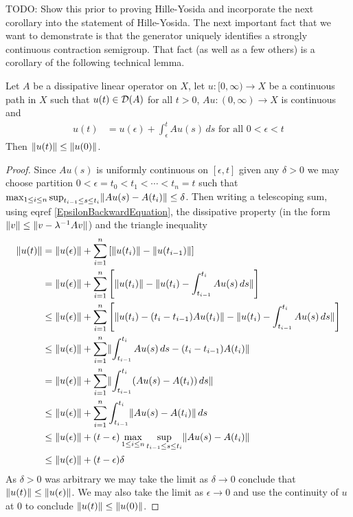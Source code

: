 TODO:  Show this prior to proving Hille-Yosida and incorporate the next corollary into the statement of Hille-Yosida.  
The next important fact that we want to demonstrate is that the generator uniquely identifies a strongly continuous contraction semigroup.  That fact (as well as a few others) is a corollary of the following technical lemma.
\begin{lem}\label{DissipativeContractivePath}Let $A$ be a dissipative linear operator on $X$, let $u : [0,\infty) \to X$ be a continuous path in $X$ such that $u(t) \in \mathcal{D}(A)$ for all $t > 0$, $A u : (0,\infty) \to X$ is continuous and 
\begin{align}\label{EpsilonBackwardEquation}
u(t) &= u(\epsilon) + \int_\epsilon^t A u(s) \, ds \text{ for all $0 < \epsilon < t$}
\end{align}
Then $\lVert u(t) \rVert \leq \lVert u(0) \rVert$.
\end{lem}
\begin{proof}
Since $Au(s)$ is uniformly continuous on $[\epsilon, t]$ given any $\delta > 0$ we may choose partition $0< \epsilon=t_0 < t_1 < \dotsb < t_n =t$ such that $\max_{1 \leq i \leq n} \sup_{t_{i-1} \leq s \leq t_i} \lVert A u(s) - A(t_i) \rVert \leq \delta$.  Then writing a telescoping sum, using eqref \ref{EpsilonBackwardEquation}, the dissipative property (in the form $\lVert v \rVert \leq \lVert v - \lambda^{-1}A v \rVert$) and the triangle inequality 
\begin{align*}
\lVert u(t) \rVert &= \lVert u(\epsilon) \rVert + \sum_{i=1}^n \left [ \lVert u(t_i) \rVert - \lVert u(t_{i-1}) \rVert \right] \\
&=\lVert u(\epsilon) \rVert + \sum_{i=1}^n \left [ \lVert u(t_i) \rVert - \lVert u(t_i) - \int_{t_{i-1}}^{t_i} A u(s) \, ds \rVert \right] \\
&\leq \lVert u(\epsilon) \rVert + \sum_{i=1}^n \left [ \lVert u(t_i) - (t_i - t_{i-1}) A u(t_i)  \rVert - \lVert u(t_i) - \int_{t_{i-1}}^{t_i} A u(s) \, ds \rVert \right] \\
&\leq \lVert u(\epsilon) \rVert + \sum_{i=1}^n  \lVert \int_{t_{i-1}}^{t_i} A u(s) \, ds - (t_i - t_{i-1}) A(t_i) \rVert \\
&= \lVert u(\epsilon) \rVert + \sum_{i=1}^n\lVert \int_{t_{i-1}}^{t_i} (A u(s) - A(t_i)) \, ds \rVert \\
&\leq \lVert u(\epsilon) \rVert + \sum_{i=1}^n\int_{t_{i-1}}^{t_i} \lVert A u(s) - A(t_i) \rVert \, ds \\
&\leq \lVert u(\epsilon) \rVert + (t - \epsilon) \max_{1 \leq i \leq n} \sup_{t_{i-1} \leq s \leq t_i} \lVert A u(s) - A(t_i) \rVert  \\
&\leq \lVert u(\epsilon) \rVert + (t - \epsilon) \delta \\
\end{align*}
As $\delta>0$ was arbitrary we may take the limit as $\delta \to 0$ conclude that $\lVert u(t) \rVert \leq \lVert u(\epsilon) \rVert$.  We may also take the limit as $\epsilon \to 0$ and use the continuity of $u$ at $0$ to conclude $\lVert u(t) \rVert \leq \lVert u(0) \rVert$.
\end{proof}

